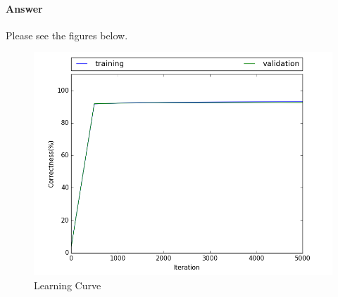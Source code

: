 \documentclass[11pt,twoside]{article}
\begin{document}
\paragraph{Answer}
Please see the figures below.
\begin{figure}[h]
	\centering
	\includegraphics[scale=0.8]{part4.png}
	\caption*{Learning Curve}
\end{figure}
\end{document}
